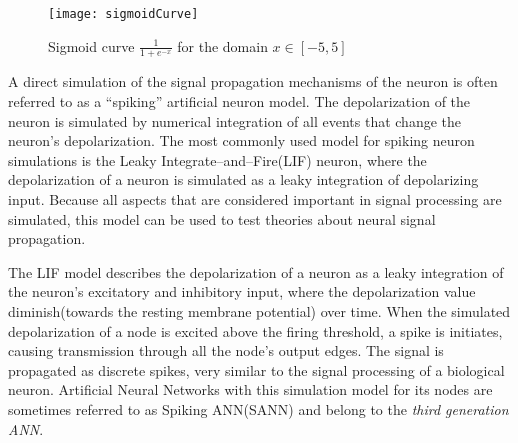 \begin{figure}[hbt!p]
	\centering
	\texttt{[image: sigmoidCurve]}
	\caption{Sigmoid curve $\frac{1}{1+e^{-x}}$ for the domain $x\in [-5,5]$}
	\label{figFigurAvNeuronet}
\end{figure}
	
	A direct simulation of the signal propagation mechanisms of the neuron is often referred to as a ``spiking'' artificial neuron model. %
	The depolarization of the neuron is simulated by numerical integration of all events that change the neuron's depolarization.
	The most commonly used model for spiking neuron simulations is the Leaky Integrate--and--Fire(LIF) neuron, where the depolarization of a neuron is simulated as a leaky integration of depolarizing input\cite{florian03}.
	Because all aspects that are considered important in signal processing are simulated, this model can be used to test theories about neural signal propagation.

	The LIF model describes the depolarization of a neuron as a leaky integration of the neuron's excitatory and inhibitory input, where the depolarization value diminish(towards the resting membrane potential) over time.
	When the simulated depolarization of a node is excited above the firing threshold, a spike is initiates, causing transmission through all the node's output edges. %
	The signal is propagated as discrete spikes, very similar to the signal processing of a biological neuron\cite{Kunkle02pulsedneural}.
	Artificial Neural Networks with this simulation model for its nodes are sometimes referred to as Spiking ANN(SANN) and belong to the \emph{third generation ANN}\cite{Maass97networksof}. %
	

